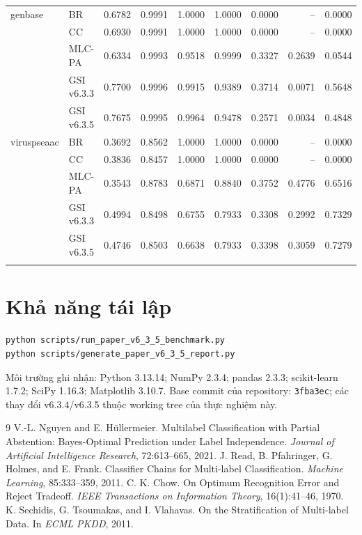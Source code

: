 \documentclass[11pt,a4paper,twoside]{article}
\begin{document}
\begin{landscape}
\begin{longtable}{llrrrrrrr}
\addlinespace[2pt]
genbase & BR & 0.6782 & 0.9991 & 1.0000 & 1.0000 & 0.0000 & -- & 0.0000 \\
 & CC & 0.6930 & 0.9991 & 1.0000 & 1.0000 & 0.0000 & -- & 0.0000 \\
 & MLC-PA & 0.6334 & 0.9993 & 0.9518 & 0.9999 & 0.3327 & 0.2639 & 0.0544 \\
 & GSI v6.3.3 & 0.7700 & 0.9996 & 0.9915 & 0.9389 & 0.3714 & 0.0071 & 0.5648 \\
 & GSI v6.3.5 & 0.7675 & 0.9995 & 0.9964 & 0.9478 & 0.2571 & 0.0034 & 0.4848 \\
\addlinespace[2pt]
viruspseaac & BR & 0.3692 & 0.8562 & 1.0000 & 1.0000 & 0.0000 & -- & 0.0000 \\
 & CC & 0.3836 & 0.8457 & 1.0000 & 1.0000 & 0.0000 & -- & 0.0000 \\
 & MLC-PA & 0.3543 & 0.8783 & 0.6871 & 0.8840 & 0.3752 & 0.4776 & 0.6516 \\
 & GSI v6.3.3 & 0.4994 & 0.8498 & 0.6755 & 0.7933 & 0.3308 & 0.2992 & 0.7329 \\
 & GSI v6.3.5 & 0.4746 & 0.8503 & 0.6638 & 0.7933 & 0.3398 & 0.3059 & 0.7279 \\
\addlinespace[2pt]
\bottomrule
\end{longtable}
\end{landscape}
\section{Khả năng tái lập}
\begin{verbatim}
python scripts/run_paper_v6_3_5_benchmark.py
python scripts/generate_paper_v6_3_5_report.py
\end{verbatim}
Môi trường ghi nhận: Python 3.13.14; NumPy 2.3.4; pandas 2.3.3; scikit-learn 1.7.2; SciPy 1.16.3; Matplotlib 3.10.7. Base commit của repository: \texttt{3fba3ec}; các thay đổi v6.3.4/v6.3.5 thuộc working tree của thực nghiệm này.
\begin{thebibliography}{9}
 V.-L. Nguyen and E. Hüllermeier. Multilabel Classification with Partial Abstention: Bayes-Optimal Prediction under Label Independence. \textit{Journal of Artificial Intelligence Research}, 72:613--665, 2021.
 J. Read, B. Pfahringer, G. Holmes, and E. Frank. Classifier Chains for Multi-label Classification. \textit{Machine Learning}, 85:333--359, 2011.
 C. K. Chow. On Optimum Recognition Error and Reject Tradeoff. \textit{IEEE Transactions on Information Theory}, 16(1):41--46, 1970.
 K. Sechidis, G. Tsoumakas, and I. Vlahavas. On the Stratification of Multi-label Data. In \textit{ECML PKDD}, 2011.
\end{thebibliography}
\end{document}
